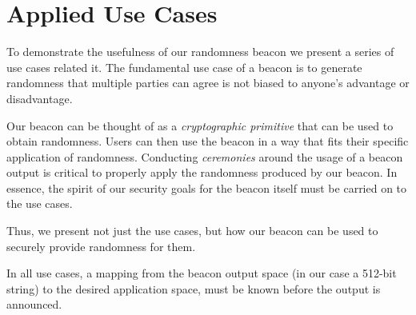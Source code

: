 \section{Applied Use Cases}\label{sec:applied_use_cases}
To demonstrate the usefulness of our randomness beacon we present a series of use cases related it.
The fundamental use case of a beacon is to generate randomness that multiple parties can agree is not biased to anyone's advantage or disadvantage.

Our beacon can be thought of as a \emph{cryptographic primitive} that can be used to obtain randomness.
Users can then use the beacon in a way that fits their specific application of randomness.
Conducting \emph{ceremonies} around the usage of a beacon output is critical to properly apply the randomness produced by our beacon.
In essence, the spirit of our security goals for the beacon itself must be carried on to the use cases.

Thus, we present not just the use cases, but how our beacon can be used to securely provide randomness for them.

In all use cases, a mapping from the beacon output space (in our case a 512-bit string) to the desired application space, must be known before the output is announced.
